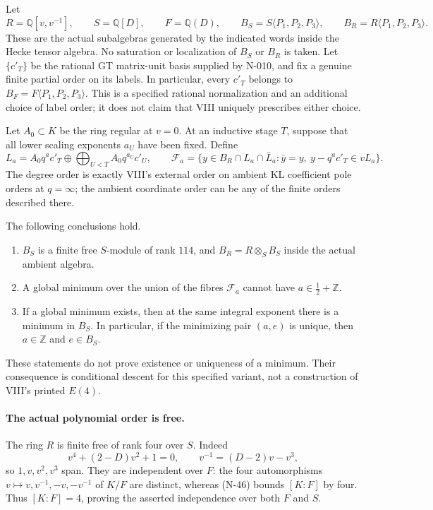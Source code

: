 Let
\[
 R=\mathbb Q[v,v^{-1}],\qquad S=\mathbb Q[D],\qquad
 F=\mathbb Q(D),\qquad
 B_S=S\langle P_1,P_2,P_3\rangle,\qquad
 B_R=R\langle P_1,P_2,P_3\rangle.
 \tag{N-44}
\]
These are the actual subalgebras generated by the indicated words
inside the Hecke tensor algebra.  No saturation or localization
of $B_S$ or $B_R$ is taken.  Let $\{c'_T\}$ be the rational GT
matrix-unit basis supplied by N-010, and fix a genuine finite
partial order on its labels.  In particular, every $c'_T$ belongs
to $B_F=F\langle P_1,P_2,P_3\rangle$.  This is a specified rational
normalization and an additional choice of label order; it does
not claim that VIII uniquely prescribes either choice.

Let $A_0\subset K$ be the ring regular at $v=0$.  At an inductive
stage $T$, suppose that all lower scaling exponents $a_U$ have
been fixed.  Define
\[
 L_a=A_0q^ac'_T\oplus
       \bigoplus_{U<T}A_0q^{a_U}c'_U,
 \qquad
 \mathcal F_a=
 \{y\in B_R\cap L_a\cap\bar L_a:
       \bar y=y,\ y-q^ac'_T\in vL_a\}.
 \tag{N-45}
\]
The degree order is exactly VIII's external order on ambient KL
coefficient pole orders at $q=\infty$; the ambient coordinate
order can be any of the finite orders described there.

The following conclusions hold.
\begin{enumerate}
\item $B_S$ is a finite free $S$-module of rank $114$, and
      $B_R=R\otimes_S B_S$ inside the actual ambient algebra.
\item A global minimum over the union of the fibres
      $\mathcal F_a$ cannot have $a\in\tfrac12+\mathbb Z$.
\item If a global minimum exists, then at the same integral
      exponent there is a minimum in $B_S$.  In particular, if
      the minimizing pair $(a,e)$ is unique, then $a\in\mathbb Z$
      and $e\in B_S$.
\end{enumerate}
These statements do not prove existence or uniqueness of a
minimum.  Their consequence is conditional descent for this
specified variant, not a construction of VIII's printed $E(4)$.

\paragraph{The actual polynomial order is free.}
The ring $R$ is finite free of rank four over $S$.  Indeed
\[
 v^4+(2-D)v^2+1=0,\qquad
 v^{-1}=(D-2)v-v^3,
 \tag{N-46}
\]
so $1,v,v^2,v^3$ span.  They are independent over $F$: the four
automorphisms $v\mapsto v,v^{-1},-v,-v^{-1}$ of $K/F$ are distinct,
whereas (N-46) bounds $[K:F]$ by four.  Thus $[K:F]=4$, proving
the asserted independence over both $F$ and $S$.

